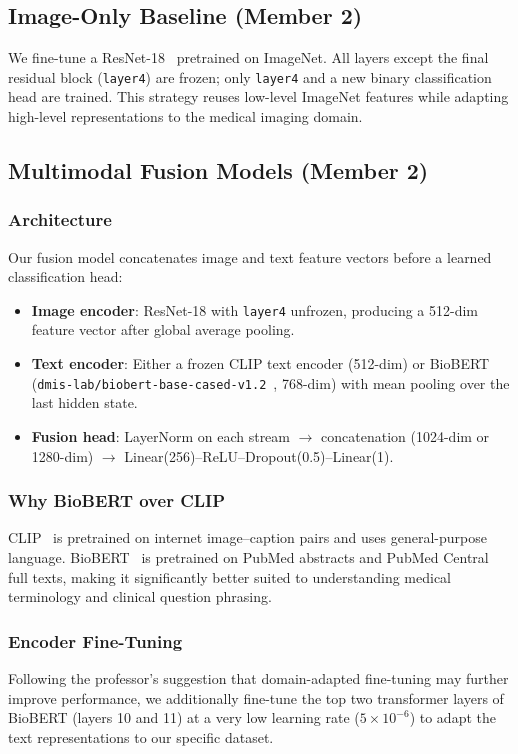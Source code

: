 \documentclass{article}
\begin{document}
\subsection{Image-Only Baseline (Member 2)}
We fine-tune a ResNet-18~\cite{he2016resnet} pretrained on ImageNet. All layers
except the final residual block (\texttt{layer4}) are frozen; only
\texttt{layer4} and a new binary classification head are trained. This strategy
reuses low-level ImageNet features while adapting high-level representations to
the medical imaging domain.

\subsection{Multimodal Fusion Models (Member 2)}

\subsubsection{Architecture}
Our fusion model concatenates image and text feature vectors before a learned
classification head:
\begin{itemize}
    \item \textbf{Image encoder}: ResNet-18 with \texttt{layer4} unfrozen,
          producing a 512-dim feature vector after global average pooling.
    \item \textbf{Text encoder}: Either a frozen CLIP text encoder (512-dim)
          or BioBERT (\texttt{dmis-lab/biobert-base-cased-v1.2}~\cite{lee2020biobert},
          768-dim) with mean pooling over the last hidden state.
    \item \textbf{Fusion head}: LayerNorm on each stream $\rightarrow$
          concatenation (1024-dim or 1280-dim) $\rightarrow$
          Linear(256)--ReLU--Dropout(0.5)--Linear(1).
\end{itemize}

\subsubsection{Why BioBERT over CLIP}
CLIP~\cite{radford2021clip} is pretrained on internet image--caption pairs and
uses general-purpose language. BioBERT~\cite{lee2020biobert} is pretrained on
PubMed abstracts and PubMed Central full texts, making it significantly better
suited to understanding medical terminology and clinical question phrasing.

\subsubsection{Encoder Fine-Tuning}
Following the professor's suggestion that domain-adapted fine-tuning may
further improve performance, we additionally fine-tune the top two transformer
layers of BioBERT (layers 10 and 11) at a very low learning rate
($5 \times 10^{-6}$) to adapt the text representations to our specific dataset.
\end{document}
